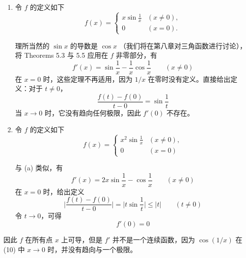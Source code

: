 \documentclass[../poma-notes.tex]{subfiles}
\begin{document}
\begin{examples}
  \begin{enumerate}[label=(\alph*)]
    \item 令 $f$ 的定义如下
          \begin{equation}
            f(x) =
            \begin{cases}
              x \sin \frac{1}{x} & (x \ne 0), \\
              0                  & (x = 0).
            \end{cases}
          \end{equation}

          理所当然的 $\sin x$ 的导数是 $\cos x$ （我们将在第八章对三角函数进行讨论），将 Theorems 5.3 与 5.5 应用在 $f$ 非零部分，有
          \begin{equation}
            f'(x) = \sin\frac{1}{x} - \frac{1}{x}\cos\frac{1}{x} \qquad (x \ne 0)
          \end{equation}
          在 $x = 0$ 时，这些定理不再适用，因为 $1/x$ 在零时没有定义。直接给出定义：对于 $t \ne 0$，
          \[
            \frac{f(t) - f(0)}{t - 0} = \sin\frac{1}{t}
          \]
          当 $x \to 0$ 时，它没有趋向任何极限，因此 $f'(0)$ 不存在。
    \item 令 $f$ 的定义如下
          \begin{equation}
            f(x) =
            \begin{cases}
              x^2 \sin\frac{1}{x} & (x \ne 0), \\
              0                   & (x = 0)
            \end{cases}
          \end{equation}

          与 (a) 类似，有
          \begin{equation}
            f'(x) = 2x \sin\frac{1}{x} - \cos\frac{1}{x} \qquad (x \ne 0)
          \end{equation}
          在 $x = 0$ 时，给出定义
          \[
            \biggl| \frac{f(t) - f(0)}{t - 0} \biggr| = \biggl| t \sin\frac{1}{t} \biggr| \le |t| \qquad (t \ne 0)
          \]
          令 $t \to 0$，可得
          \begin{equation}
            f'(0) = 0
          \end{equation}
  \end{enumerate}

  因此 $f$ 在所有点 $x$ 上可导，但是 $f'$ 并不是一个连续函数，因为 $\cos(1/x)$ 在 (10) 中 $x \to 0$ 时，并没有趋向与一个极限。
\end{examples}
\end{document}
